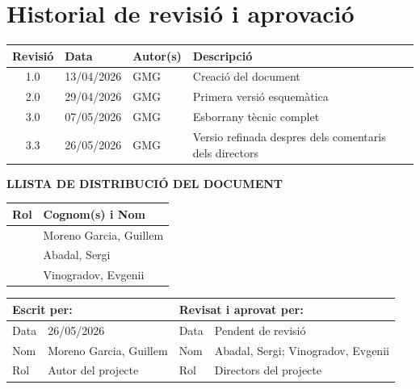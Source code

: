 \vspace*{0cm}

\chapter*{Historial de revisió i aprovació}
{}

\begin{tabularx}{\textwidth}{|c|l|l|X|}
  \hline
    \textbf{Revisió} & \textbf{Data} & \textbf{Autor(s)} & \textbf{Descripció} \\
  \hline
    1.0 & 13/04/2026 & GMG & Creació del document \\
  \hline
    2.0 & 29/04/2026 & GMG & Primera versió esquemàtica \\
  \hline
    3.0 & 07/05/2026 & GMG & Esborrany tècnic complet \\
  \hline
    3.3 & 26/05/2026 & GMG & Versio refinada despres dels comentaris dels directors \\
  \hline
\end{tabularx}

\vspace{1cm}

\textbf{LLISTA DE DISTRIBUCIÓ DEL DOCUMENT}

\begin{tabularx}{\textwidth}{|l|X|}
  \hline
    \textbf{Rol} & \textbf{Cognom(s) i Nom} \\
  \hline
    [Estudiant] & Moreno Garcia, Guillem \\
  \hline
    [Director del projecte] & Abadal, Sergi \\
  \hline
    [Director 2 (si aplica)] & Vinogradov, Evgenii \\
  \hline
\end{tabularx}

\vspace{1cm}

\begin{tabularx}{\textwidth}{|l|X||l|X|}
  \hline
    \multicolumn{2}{|l||}{\textbf{Escrit per:}}  &  \multicolumn{2}{l|}{\textbf{Revisat i aprovat per:}} \\
  \hline
    Data &  26/05/2026 & Data &  Pendent de revisió \\
  \hline
    Nom &  Moreno Garcia, Guillem & Nom &  Abadal, Sergi; Vinogradov, Evgenii \\
  \hline
    Rol & Autor del projecte & Rol & Directors del projecte \\
  \hline
\end{tabularx}
